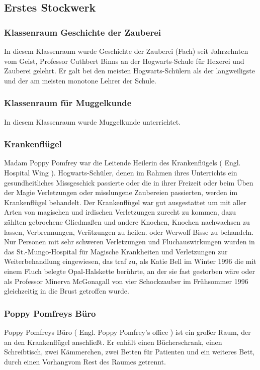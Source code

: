 \documentclass[a4paper, 10pt]{article}
\begin{document}
\subsection*{\Large Erstes Stockwerk}
\subsubsection*{\large Klassenraum Geschichte der Zauberei}
In diesem Klassenraum wurde Geschichte der Zauberei (Fach) seit Jahrzehnten vom Geist, Professor Cuthbert Binns an der Hogwarts-Schule für Hexerei und Zauberei gelehrt. Er galt bei den meisten Hogwarts-Schülern als der langweiligste und der am meisten monotone Lehrer der Schule.
\subsubsection*{\large Klassenraum für Muggelkunde}
In diesem Klassenraum wurde Muggelkunde unterrichtet.
\subsubsection*{\large Krankenflügel}
Madam Poppy Pomfrey war die Leitende Heilerin des Krankenflügels (  Engl.  Hospital Wing ). Hogwarts-Schüler, denen im Rahmen ihres Unterrichts ein gesundheitliches Missgeschick passierte oder die in ihrer Freizeit oder beim Üben der Magie Verletzungen oder misslungene Zaubereien passierten, werden im Krankenflügel behandelt. Der Krankenflügel war gut ausgestattet um mit aller Arten von magischen und irdischen Verletzungen zurecht zu kommen, dazu zählten gebrochene Gliedmaßen und andere Knochen, Knochen nachwachsen zu lassen, Verbrennungen, Verätzungen zu heilen. oder Werwolf-Bisse zu behandeln.
\vspace{10pt}
\newline
{}  
Nur Personen mit sehr schweren Verletzungen und Fluchauswirkungen wurden in das St.-Mungo-Hospital für Magische Krankheiten und Verletzungen zur Weiterbehandlung eingewiesen, das traf zu, als Katie Bell im Winter 1996 die mit einem Fluch belegte Opal-Halskette berührte, an der sie fast gestorben wäre oder als Professor Minerva McGonagall von vier Schockzauber im Frühsommer 1996 gleichzeitig in die Brust getroffen wurde.
\subsubsection*{\large Poppy Pomfreys Büro}
Poppy Pomfreys Büro (  Engl.  Poppy Pomfrey's office ) ist ein großer Raum, der an den Krankenflügel anschließt. Er enhält einen Bücherschrank, einen Schreibtisch, zwei Kämmerchen, zwei Betten für Patienten und ein weiteres Bett, durch einen Vorhangvom Rest des Raumes getrennt.
\end{document}

